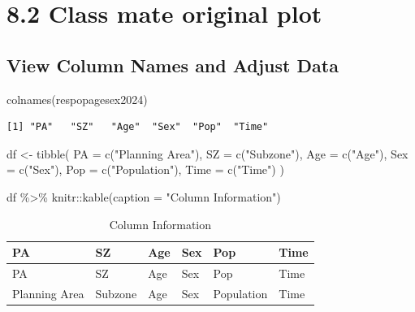 \documentclass[
  letterpaper,
  DIV=11,
  numbers=noendperiod]{scrartcl}
\newenvironment{Shaded}{\begin{snugshade}}{\end{snugshade}}
\newcommand{\AttributeTok}[1]{\textcolor[rgb]{0.40,0.45,0.13}{#1}}
\newcommand{\FunctionTok}[1]{\textcolor[rgb]{0.28,0.35,0.67}{#1}}
\newcommand{\NormalTok}[1]{\textcolor[rgb]{0.00,0.23,0.31}{#1}}
\newcommand{\OtherTok}[1]{\textcolor[rgb]{0.00,0.23,0.31}{#1}}
\newcommand{\SpecialCharTok}[1]{\textcolor[rgb]{0.37,0.37,0.37}{#1}}
\newcommand{\StringTok}[1]{\textcolor[rgb]{0.13,0.47,0.30}{#1}}
\begin{document}
\section{8.2 Class mate original plot}\label{class-mate-original-plot}

\subsection{View Column Names and Adjust
Data}\label{view-column-names-and-adjust-data}

\begin{Shaded}
\begin{Highlighting}[]
\FunctionTok{colnames}\NormalTok{(respopagesex2024)}
\end{Highlighting}
\end{Shaded}

\begin{verbatim}
[1] "PA"   "SZ"   "Age"  "Sex"  "Pop"  "Time"
\end{verbatim}

\begin{Shaded}
\begin{Highlighting}[]
\NormalTok{df }\OtherTok{\textless{}{-}} \FunctionTok{tibble}\NormalTok{(}
  \AttributeTok{PA =} \FunctionTok{c}\NormalTok{(}\StringTok{"Planning Area"}\NormalTok{),}
  \AttributeTok{SZ =} \FunctionTok{c}\NormalTok{(}\StringTok{"Subzone"}\NormalTok{),}
  \AttributeTok{Age =} \FunctionTok{c}\NormalTok{(}\StringTok{"Age"}\NormalTok{),}
  \AttributeTok{Sex =} \FunctionTok{c}\NormalTok{(}\StringTok{"Sex"}\NormalTok{),}
  \AttributeTok{Pop =} \FunctionTok{c}\NormalTok{(}\StringTok{"Population"}\NormalTok{),}
  \AttributeTok{Time =} \FunctionTok{c}\NormalTok{(}\StringTok{"Time"}\NormalTok{)}
\NormalTok{)}

\NormalTok{df }\SpecialCharTok{\%\textgreater{}\%}
\NormalTok{  knitr}\SpecialCharTok{::}\FunctionTok{kable}\NormalTok{(}\AttributeTok{caption =} \StringTok{"Column Information"}\NormalTok{)}
\end{Highlighting}
\end{Shaded}

\begin{longtable}[]{@{}llllll@{}}
\caption{Column Information}\tabularnewline
\toprule\noalign{}
PA & SZ & Age & Sex & Pop & Time \\
\midrule\noalign{}
\endfirsthead
\toprule\noalign{}
PA & SZ & Age & Sex & Pop & Time \\
\midrule\noalign{}
\endhead
\bottomrule\noalign{}
\endlastfoot
Planning Area & Subzone & Age & Sex & Population & Time \\
\end{longtable}
\end{document}

